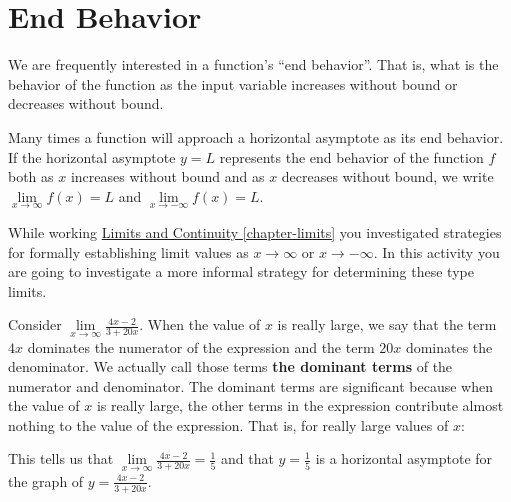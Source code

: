 \documentclass[12pt,]{book}
\newcommand{\terminology}[1]{\textbf{#1}}
\theoremstyle{plain}
\theoremstyle{definition}
\numberwithin{equation}{section}
\newcounter{figstack}
\newcounter{figindex}
\newlength\fight
\newcommand\pushValignCaptionBottom[5][b]{%
\stepcounter{figstack}%
\expandafter\def\csname %
figalign\romannumeral\value{figstack}\endcsname{#1}%
\expandafter\def\csname %
figtype\romannumeral\value{figstack}\endcsname{#2}%
\expandafter\def\csname %
figwd\romannumeral\value{figstack}\endcsname{#3}%
\expandafter\def\csname %
figcontent\romannumeral\value{figstack}\endcsname{#4}%
\expandafter\def\csname %
figcap\romannumeral\value{figstack}\endcsname{#5}%
\setbox0=\hbox{%
\begin{#2}{#3}#4\end{#2}}%
\ifdim\dimexpr\ht0+\dp0\relax>\fight\global\setlength{\fight}{%
\dimexpr\ht0+\dp0\relax}\fi%
}
\newcommand\popValignCaptionBottom{%
\setcounter{figindex}{0}%
\hfill%
\whiledo{\value{figindex}<\value{figstack}}{%
\stepcounter{figindex}%
\def\tmp{\csname figwd\romannumeral\value{figindex}\endcsname}%
\begin{\csname figtype\romannumeral\value{figindex}\endcsname}[t]{\tmp}%
\centering%
\stackinset{c}{}%
{\csname figalign\romannumeral\value{figindex}\endcsname}{}%
{\csname figcontent\romannumeral\value{figindex}\endcsname}%
{\rule{0pt}{\fight}}\par%
\csname figcap\romannumeral\value{figindex}\endcsname%
\end{\csname figtype\romannumeral\value{figindex}\endcsname}%
\hfill%
}%
\setcounter{figstack}{0}%
\setlength{\fight}{0pt}%
\hfill%
}
\newcommand{\fe}[2]{#1\mathopen{}\left(#2\right)\mathclose{}}
\begin{document}
\section[End Behavior]{End Behavior}\label{section-end-behavior}
We are frequently interested in a function's ``end behavior''.  That is, what is the behavior of the function as the input variable increases without bound or decreases without bound.%
\par
Many times a function will approach a horizontal asymptote as its end behavior.  If the horizontal asymptote \(y=L\) represents the end behavior of the function \(f\) both as \(x\) increases without bound and as \(x\) decreases without bound, we write \(\lim\limits_{x\to\infty}\fe{f}{x}=L\) and \(\lim\limits_{x\to-\infty}\fe{f}{x}=L\).%
\par
While working \hyperref[chapter-limits]{Limits and Continuity \ref{chapter-limits}} you investigated strategies for formally establishing limit values as \(x\to\infty\) or \(x\to-\infty\).  In this activity you are going to investigate a more informal strategy for determining these type limits.%
\par
Consider \(\lim\limits_{x\to\infty}\frac{4x-2}{3+20x}\). When the value of \(x\) is really large, we say that the term \(4x\) dominates the numerator of the expression and the term \(20x\) dominates the denominator. We actually call those terms \terminology{the dominant terms} of the numerator and denominator.  The dominant terms are significant because when the value of \(x\) is really large, the other terms in the expression contribute almost nothing to the value of the expression.   That is, for really large values of \(x\):%
\par
This tells us that \(\lim\limits_{x\to\infty}\frac{4x-2}{3+20x}=\frac{1}{5}\) and that \(y=\frac{1}{5}\) is a horizontal asymptote for the graph of \(y=\frac{4x-2}{3+20x}\).%
\typeout{************************************************}
\typeout{************************************************}
\end{document}
